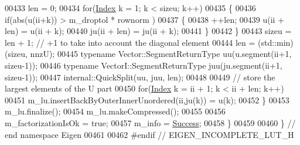 \begin{DoxyCode}
00433     len = 0;
00434     \textcolor{keywordflow}{for}(\hyperlink{namespace_eigen_a62e77e0933482dafde8fe197d9a2cfde}{Index} k = 1; k < sizeu; k++)
00435     \{
00436       \textcolor{keywordflow}{if}(abs(u(ii+k)) > m\_droptol * rownorm )
00437       \{
00438         ++len;
00439         u(ii + len)  = u(ii + k);
00440         ju(ii + len) = ju(ii + k);
00441       \}
00442     \}
00443     sizeu = len + 1; \textcolor{comment}{// +1 to take into account the diagonal element}
00444     len = (std::min)(sizeu, nnzU);
00445     \textcolor{keyword}{typename} Vector::SegmentReturnType uu(u.segment(ii+1, sizeu-1));
00446     \textcolor{keyword}{typename} VectorI::SegmentReturnType juu(ju.segment(ii+1, sizeu-1));
00447     internal::QuickSplit(uu, juu, len);
00448 
00449     \textcolor{comment}{// store the largest elements of the U part}
00450     \textcolor{keywordflow}{for}(\hyperlink{namespace_eigen_a62e77e0933482dafde8fe197d9a2cfde}{Index} k = ii + 1; k < ii + len; k++)
00451       m\_lu.insertBackByOuterInnerUnordered(ii,ju(k)) = u(k);
00452   \}
00453   m\_lu.finalize();
00454   m\_lu.makeCompressed();
00455 
00456   m\_factorizationIsOk = \textcolor{keyword}{true};
00457   m\_info = \hyperlink{group__enums_gga85fad7b87587764e5cf6b513a9e0ee5ea52581b035f4b59c203b8ff999ef5fcea}{Success};
00458 \}
00459 
00460 \} \textcolor{comment}{// end namespace Eigen}
00461 
00462 \textcolor{preprocessor}{#endif // EIGEN\_INCOMPLETE\_LUT\_H}
\end{DoxyCode}
